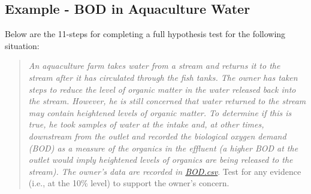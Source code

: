 \documentclass[10pt,openany]{book}\usepackage[]{graphicx}\usepackage[]{color}
\begin{document}
\vspace*{12pt}
\subsection{Example - BOD in Aquaculture Water}
Below are the 11-steps  for completing a full hypothesis test for the following situation:
\vspace*{-6pt}
\begin{quote}
\textsl{An aquaculture farm takes water from a stream and returns it to the stream after it has circulated through the fish tanks. The owner has taken steps to reduce the level of organic matter in the water released back into the stream. However, he is still concerned that water returned to the stream may contain heightened levels of organic matter. To determine if this is true, he took samples of water at the intake and, at other times, downstream from the outlet and recorded the biological oxygen demand (BOD) as a measure of the organics in the effluent (a higher BOD at the outlet would imply heightened levels of organics are being released to the stream). The owner's data are recorded in \href{https://raw.githubusercontent.com/droglenc/NCData/master/BOD.csv}{BOD.csv}}. Test for any evidence (i.e., at the 10\% level) to support the owner's concern.
\end{quote}
\vspace*{-12pt}
\end{document}
